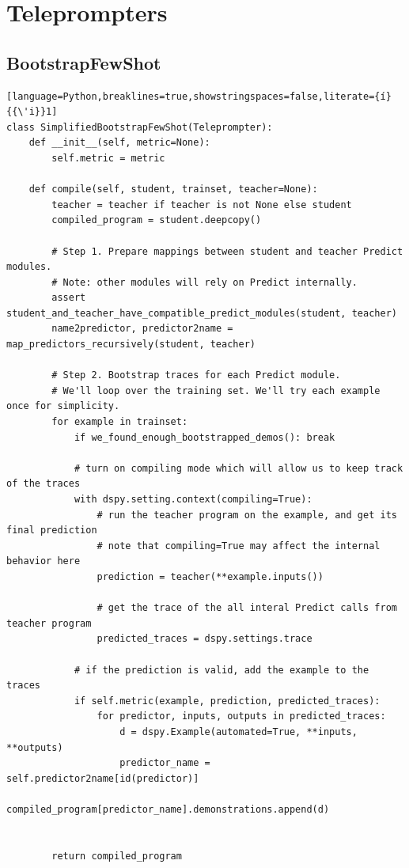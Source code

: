 \clearpage
\section{Teleprompters}\label{subsec:teleprompters_pseudocode}
\subsection{BootstrapFewShot}\label{code:BootstrapFewShot}
\begin{lstlisting}[language=Python,breaklines=true,showstringspaces=false,literate={í}{{\'i}}1]
class SimplifiedBootstrapFewShot(Teleprompter):
    def __init__(self, metric=None):
        self.metric = metric

    def compile(self, student, trainset, teacher=None):
        teacher = teacher if teacher is not None else student
        compiled_program = student.deepcopy()

        # Step 1. Prepare mappings between student and teacher Predict modules.
        # Note: other modules will rely on Predict internally.
        assert student_and_teacher_have_compatible_predict_modules(student, teacher)
        name2predictor, predictor2name = map_predictors_recursively(student, teacher)

        # Step 2. Bootstrap traces for each Predict module.
        # We'll loop over the training set. We'll try each example once for simplicity.
        for example in trainset:
            if we_found_enough_bootstrapped_demos(): break

            # turn on compiling mode which will allow us to keep track of the traces
            with dspy.setting.context(compiling=True):
                # run the teacher program on the example, and get its final prediction
                # note that compiling=True may affect the internal behavior here
                prediction = teacher(**example.inputs())

                # get the trace of the all interal Predict calls from teacher program
                predicted_traces = dspy.settings.trace
            
            # if the prediction is valid, add the example to the traces
            if self.metric(example, prediction, predicted_traces):
                for predictor, inputs, outputs in predicted_traces:
                    d = dspy.Example(automated=True, **inputs, **outputs)
                    predictor_name = self.predictor2name[id(predictor)]
                    compiled_program[predictor_name].demonstrations.append(d)


        return compiled_program
\end{lstlisting}

